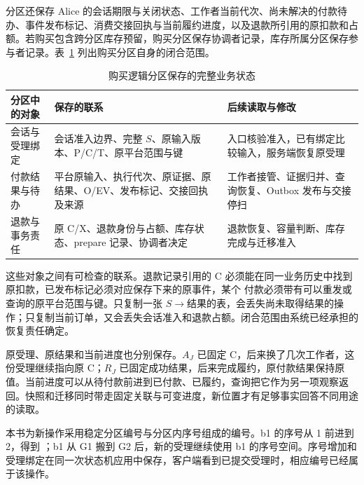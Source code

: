 分区还保存 Alice 的会话期限与关闭状态、工作者当前代次、尚未解决的付款待办、事件发布标记、消费交接回执与当前履约进度，以及退款所引用的原扣款和占额。若购买包含跨分区库存预留，购买分区保存协调者记录，库存所属分区保存参与者记录。表~\ref{tab:ch17-state} 列出购买分区自身的闭合范围。

\begin{table}[htbp]\centering\small
\begin{tabularx}{\linewidth}{@{}p{.19\linewidth}XX@{}}
\toprule
分区中的对象 & 保存的联系 & 后续读取与修改\\
\midrule
会话与受理绑定 & 会话准入边界、完整 $S$、原输入版本、P/C/T、原平台范围与键 & 入口核验准入，已有绑定比较输入，服务端恢复原受理\\
付款结果与待办 & 平台原输入、执行代次、原证据、原结果、O/EV、发布标记、交接回执及来源 & 工作者接管、证据归并、查询恢复、Outbox 发布与交接停扫\\
退款与事务责任 & 原 C/X、退款身份与占额、库存状态、prepare 记录、协调者决定 & 退款恢复、容量判断、库存完成与迁移准入\\
\bottomrule
\end{tabularx}
\caption{购买逻辑分区保存的完整业务状态}\label{tab:ch17-state}
\end{table}

这些对象之间有可检查的联系。退款记录引用的 C 必须能在同一业务历史中找到原扣款，已发布标记必须对应保存下来的原事件，某个  付款必须带有可以重发或查询的原平台范围与键。只复制一张 $S\to$结果的表，会丢失尚未取得结果的操作；只复制当前订单，又会丢失会话准入和退款占额。闭合范围由系统已经承担的恢复责任确定。


原受理、原结果和当前进度也分别保存。$A_J$ 已固定 C，后来换了几次工作者，这份受理继续指向原 C；$R_J$ 已固定成功结果，后来完成履约，原付款结果保持原值。当前进度可以从待付款前进到已付款、已履约，查询把它作为另一项观察返回。快照和迁移同时带走固定关联与可变进度，新位置才有足够事实回答不同用途的读取。


本书为新操作采用稳定分区编号与分区内序号组成的编号。b1 的序号从 1 前进到 2，得到 ；b1 从 G1 搬到 G2 后，新的受理继续使用 b1 的序号空间。序号增加和受理绑定在同一次状态机应用中保存，客户端看到已提交受理时，相应编号已经属于该操作。


